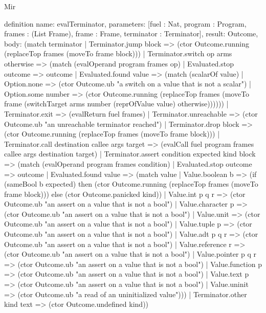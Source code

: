 \begin{lexlean}{Mir}
\begin{semanticmodule}
definition{
  name: evalTerminator,
  parameters: [fuel : Nat, program : Program, frames : (List Frame), frame : Frame, terminator : Terminator],
  result: Outcome,
  body: (match terminator
    | Terminator.jump block => (ctor Outcome.running (replaceTop frames (moveTo frame block)))
    | Terminator.switch op arms otherwise => (match (evalOperand program frames op)
      | Evaluated.stop outcome => outcome
      | Evaluated.found value => (match (scalarOf value)
        | Option.none => (ctor Outcome.ub "a switch on a value that is not a scalar")
        | Option.some number => (ctor Outcome.running (replaceTop frames (moveTo frame (switchTarget arms number (reprOfValue value) otherwise))))))
    | Terminator.exit => (evalReturn fuel frames)
    | Terminator.unreachable => (ctor Outcome.ub "an unreachable terminator reached")
    | Terminator.drop block => (ctor Outcome.running (replaceTop frames (moveTo frame block)))
    | Terminator.call destination callee args target => (evalCall fuel program frames callee args destination target)
    | Terminator.assert condition expected kind block => (match (evalOperand program frames condition)
      | Evaluated.stop outcome => outcome
      | Evaluated.found value => (match value
        | Value.boolean b => (if (sameBool b expected) then (ctor Outcome.running (replaceTop frames (moveTo frame block))) else (ctor Outcome.panicked kind))
        | Value.int p q r => (ctor Outcome.ub "an assert on a value that is not a bool")
        | Value.character p => (ctor Outcome.ub "an assert on a value that is not a bool")
        | Value.unit => (ctor Outcome.ub "an assert on a value that is not a bool")
        | Value.tuple p => (ctor Outcome.ub "an assert on a value that is not a bool")
        | Value.adt p q r => (ctor Outcome.ub "an assert on a value that is not a bool")
        | Value.reference r => (ctor Outcome.ub "an assert on a value that is not a bool")
        | Value.pointer p q r => (ctor Outcome.ub "an assert on a value that is not a bool")
        | Value.function p => (ctor Outcome.ub "an assert on a value that is not a bool")
        | Value.text p => (ctor Outcome.ub "an assert on a value that is not a bool")
        | Value.uninit => (ctor Outcome.ub "a read of an uninitialized value")))
    | Terminator.other kind text => (ctor Outcome.undefined kind))
}


\end{semanticmodule}
\end{lexlean}
